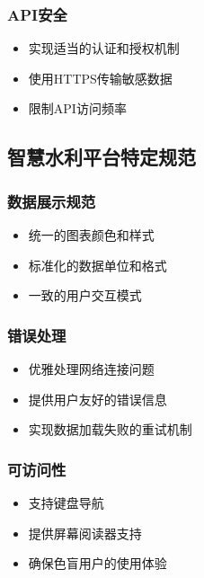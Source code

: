 \subsubsection{API安全}\label{apiux5b89ux5168}

\begin{itemize}
\tightlist
\item
  实现适当的认证和授权机制
\item
  使用HTTPS传输敏感数据
\item
  限制API访问频率
\end{itemize}

\subsection{智慧水利平台特定规范}\label{ux667aux6167ux6c34ux5229ux5e73ux53f0ux7279ux5b9aux89c4ux8303}

\subsubsection{数据展示规范}\label{ux6570ux636eux5c55ux793aux89c4ux8303}

\begin{itemize}
\tightlist
\item
  统一的图表颜色和样式
\item
  标准化的数据单位和格式
\item
  一致的用户交互模式
\end{itemize}

\subsubsection{错误处理}\label{ux9519ux8befux5904ux7406}

\begin{itemize}
\tightlist
\item
  优雅处理网络连接问题
\item
  提供用户友好的错误信息
\item
  实现数据加载失败的重试机制
\end{itemize}

\subsubsection{可访问性}\label{ux53efux8bbfux95eeux6027}

\begin{itemize}
\tightlist
\item
  支持键盘导航
\item
  提供屏幕阅读器支持
\item
  确保色盲用户的使用体验
\end{itemize}

